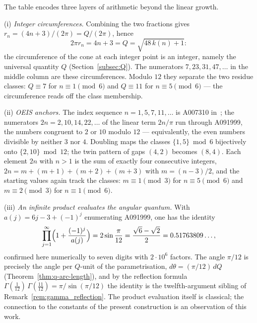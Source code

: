 \begin{remark}
\label{rem:radius_arithmetic}
The table encodes three layers of arithmetic beyond the linear growth.

(i) \emph{Integer circumferences.} Combining the two fractions gives
$r_n = (4n+3)/(2\pi) = Q/(2\pi)$, hence
\begin{equation}\label{eq:circumference_Q}
  2\pi r_n = 4n+3 = Q = \sqrt{48\,k(n)+1}:
\end{equation}
the circumference of the cone at each integer point is an integer,
namely the universal quantity $Q$ (Section~\ref{subsec:Q}). The
numerators $7, 23, 31, 47, \ldots$ in the middle column are these
circumferences. Modulo $12$ they separate the two residue classes:
$Q \equiv 7$ for $n \equiv 1 \pmod 6$ and $Q \equiv 11$ for
$n \equiv 5 \pmod 6$ --- the circumference reads off the class
membership.

(ii) \emph{OEIS anchors.} The index sequence $n = 1, 5, 7, 11, \ldots$
is A007310 in~\cite{OEIS}; the numerators $2n = 2, 10, 14, 22, \ldots$
of the linear term $2n/\pi$ run through A091999, the numbers congruent
to $2$ or $10$ modulo $12$ --- equivalently, the even numbers divisible
by neither $3$ nor $4$. Doubling maps the classes $\{1,5\} \bmod 6$
bijectively onto $\{2,10\} \bmod 12$; the twin pattern of gaps $(4,2)$
becomes $(8,4)$. Each element $2n$ with $n > 1$ is the sum of exactly
four consecutive integers, $2n = m + (m{+}1) + (m{+}2) + (m{+}3)$ with
$m = (n-3)/2$, and the starting values again track the classes:
$m \equiv 1 \pmod 3$ for $n \equiv 5 \pmod 6$ and $m \equiv 2 \pmod 3$
for $n \equiv 1 \pmod 6$.

(iii) \emph{An infinite product evaluates the angular quantum.} With
$a(j) = 6j - 3 + (-1)^j$ enumerating A091999, one has the
identity~\cite{OEIS}
\begin{equation}\label{eq:product_sin}
  \prod_{j=1}^{\infty} \Bigl(1 + \frac{(-1)^j}{a(j)}\Bigr)
  = 2\sin\frac{\pi}{12} = \frac{\sqrt{6}-\sqrt{2}}{2}
  = 0.51763809\ldots,
\end{equation}
confirmed here numerically to seven digits with $2 \cdot 10^6$
factors. The angle $\pi/12$ is precisely the angle per $Q$-unit of the
parametrisation, $d\theta = (\pi/12)\,dQ$
(Theorem~\ref{thm:q-arc-length}), and by the reflection formula
$\Gamma(\tfrac{1}{12})\,\Gamma(\tfrac{11}{12}) = \pi/\sin(\pi/12)$ the
identity is the twelfth-argument sibling of
Remark~\ref{rem:gamma_reflection}. The product evaluation itself is
classical; the connection to the constants of the present construction
is an observation of this work.
\end{remark}

